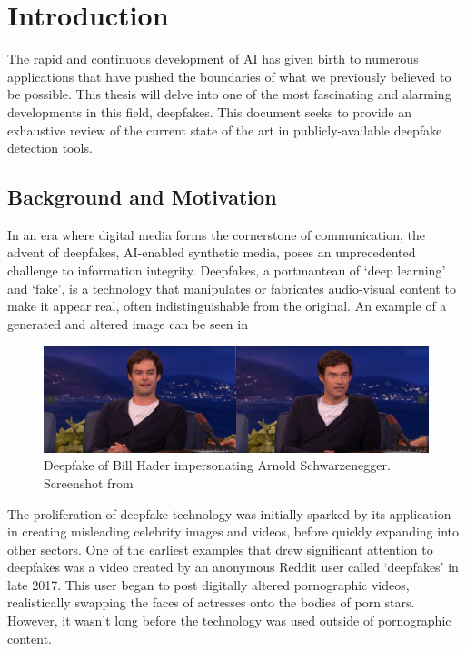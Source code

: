 
\chapter{Introduction}\label{chapter:introduction}
The rapid and continuous development of \ac{AI} has given birth to numerous
applications that have pushed the boundaries of what we previously believed to be possible.
This thesis will delve into one of the most fascinating and alarming developments in this
field, deepfakes. This document seeks to provide an exhaustive review of the current state
of the art in publicly-available deepfake detection tools.



\section{Background and Motivation}\label{chapter:backgroundAndMotivation}
In an era where digital media forms the cornerstone of communication, the advent of deepfakes,
\ac{AI}-enabled synthetic media, poses an unprecedented challenge to information integrity.
Deepfakes, a portmanteau of `deep learning' and `fake', is a technology that manipulates or
fabricates audio-visual content to make it appear real, often indistinguishable from the original.
An example of a generated and altered image can be seen in 

\begin{figure}[hb]
    \centering
    \includegraphics[scale=0.289]{figures/bill-arnold}
    \caption{Deepfake of Bill Hader impersonating Arnold Schwarzenegger. Screenshot from~\cite{bill-hader}}\label{fig:bill-hagel}
\end{figure}

The proliferation of deepfake technology was initially sparked by its application in creating
misleading celebrity images and videos, before quickly expanding into other sectors. One of the
earliest examples that drew significant attention to deepfakes was a video created by an anonymous
Reddit user called `deepfakes' in late 2017. This user began to post digitally altered pornographic
videos, realistically swapping the faces of actresses onto the bodies of porn stars. However, it
wasn't long before the technology was used outside of pornographic content.

